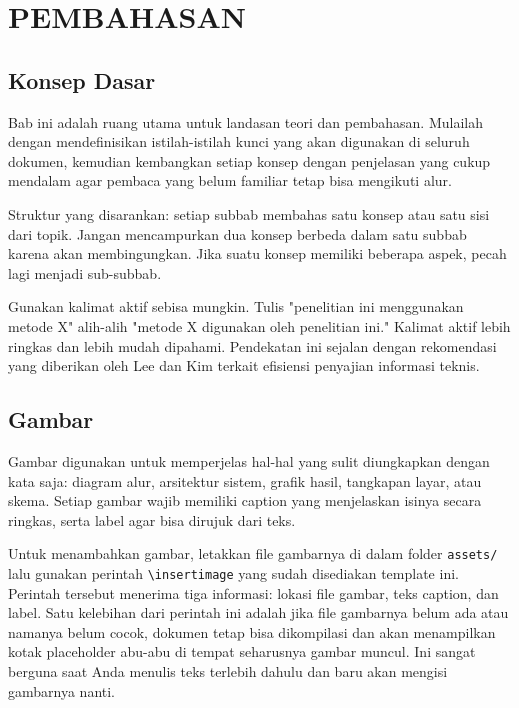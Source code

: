 \chapter{PEMBAHASAN}

\section{Konsep Dasar}
Bab ini adalah ruang utama untuk landasan teori dan pembahasan. Mulailah dengan mendefinisikan istilah-istilah kunci yang akan digunakan di seluruh dokumen, kemudian kembangkan setiap konsep dengan penjelasan yang cukup mendalam agar pembaca yang belum familiar tetap bisa mengikuti alur.

Struktur yang disarankan: setiap subbab membahas satu konsep atau satu sisi dari topik. Jangan mencampurkan dua konsep berbeda dalam satu subbab karena akan membingungkan. Jika suatu konsep memiliki beberapa aspek, pecah lagi menjadi sub-subbab.

Gunakan kalimat aktif sebisa mungkin. Tulis "penelitian ini menggunakan metode X" alih-alih "metode X digunakan oleh penelitian ini." Kalimat aktif lebih ringkas dan lebih mudah dipahami. Pendekatan ini sejalan dengan rekomendasi yang diberikan oleh Lee dan Kim \parencite{lee2019} terkait efisiensi penyajian informasi teknis.

\section{Gambar}
Gambar digunakan untuk memperjelas hal-hal yang sulit diungkapkan dengan kata saja: diagram alur, arsitektur sistem, grafik hasil, tangkapan layar, atau skema. Setiap gambar wajib memiliki caption yang menjelaskan isinya secara ringkas, serta label agar bisa dirujuk dari teks.

Untuk menambahkan gambar, letakkan file gambarnya di dalam folder \texttt{assets/} lalu gunakan perintah \texttt{\textbackslash insertimage} yang sudah disediakan template ini. Perintah tersebut menerima tiga informasi: lokasi file gambar, teks caption, dan label. Satu kelebihan dari perintah ini adalah jika file gambarnya belum ada atau namanya belum cocok, dokumen tetap bisa dikompilasi dan akan menampilkan kotak placeholder abu-abu di tempat seharusnya gambar muncul. Ini sangat berguna saat Anda menulis teks terlebih dahulu dan baru akan mengisi gambarnya nanti.



